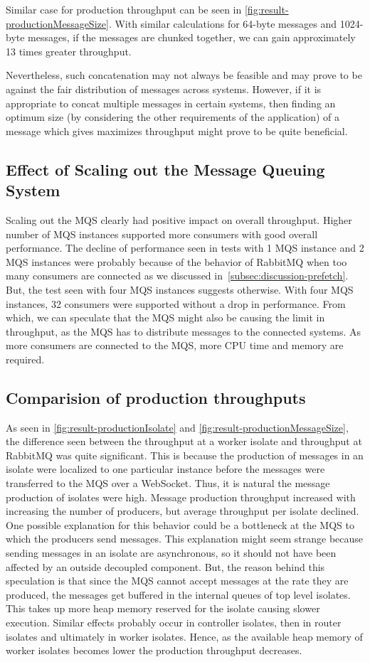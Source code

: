   Similar case for production throughput can be seen in \autoref{fig:result-productionMessageSize}. With similar calculations for 64-byte messages and 1024-byte messages, if the messages are chunked together, we can gain approximately 13 times greater throughput.

  Nevertheless, such concatenation may not always be feasible and may prove to be against the fair distribution of messages across systems. However, if it is appropriate to concat multiple messages in certain systems, then finding an optimum size (by considering the other requirements of the application) of a message which gives maximizes throughput might prove to be quite beneficial.

\subsection{Effect of Scaling out the Message Queuing System}
  Scaling out the MQS clearly had positive impact on overall throughput. Higher number of MQS instances supported more consumers with good overall performance. The decline of performance seen in tests with 1 MQS instance and 2 MQS instances were probably because of the behavior of RabbitMQ when too many consumers are connected as we discussed in~\autoref{subsec:discussion-prefetch}. But, the test seen with four MQS instances suggests otherwise. With four MQS instances, 32 consumers were supported without a drop in performance. From which, we can speculate that the MQS might also be causing the limit in throughput, as the MQS has to distribute messages to the connected systems. As more consumers are connected to the MQS, more CPU time and memory are required.

\subsection{Comparision of production throughputs}
  As seen in \autoref{fig:result-productionIsolate} and \autoref{fig:result-productionMessageSize}, the difference seen between the throughput at a worker isolate and throughput at RabbitMQ was quite significant. This is because the production of messages in an isolate were localized to one particular instance before the messages were transferred to the MQS over a WebSocket. Thus, it is natural the message production of isolates were high. Message production throughput increased with increasing the number of producers, but average throughput per isolate declined. One possible explanation for this behavior could be a bottleneck at the MQS to which the producers send messages. This explanation might seem strange because sending messages in an isolate are asynchronous, so it should not have been affected by an outside decoupled component. But, the reason behind this speculation is that since the MQS cannot accept messages at the rate they are produced, the messages get buffered in the internal queues of top level isolates. This takes up more heap memory reserved for the isolate causing slower execution. Similar effects probably occur in controller isolates, then in router isolates and ultimately in worker isolates. Hence, as the available heap memory of worker isolates becomes lower the production throughput decreases.

